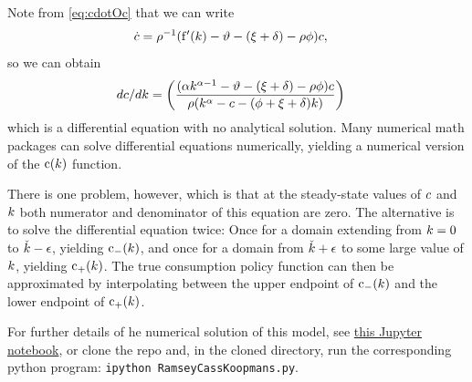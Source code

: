 \documentclass{handout}
\begin{document}
{  Note from \eqref{eq:cdotOc} that we can write
  \begin{equation}\begin{gathered}\begin{aligned}
    \dot{c} & =   \rho^{-1}(\mathrm{f}^{\prime}({k})-\vartheta -(\xi+\delta)-\rho \phi)c \label{eq:cdot},
  \end{aligned}\end{gathered}\end{equation}
  so we can obtain 
  \begin{equation}\begin{gathered}\begin{aligned}
    dc/d{k} & =  \left(\frac{(\alpha {k}^{\alpha-1}-\vartheta -(\xi+\delta)-\rho \phi)c}
                       {\rho({k}^{\alpha} - c - (\phi +\xi+\delta) {k})}\right)
  \end{aligned}\end{gathered}\end{equation}
  which is a differential equation with no analytical solution.  Many numerical math packages can solve differential equations numerically, yielding a numerical version of the $\mathrm{c}({k})$ function.

  There is one problem, however, which is that at the steady-state values of $c$ and ${k}$ both numerator and denominator of this equation are zero.  The alternative is to solve the differential equation twice: Once for a domain extending from ${k}=0$ to $\check{{k}}-\epsilon$, yielding $\mathrm{c}_{-}({k})$, and once for a domain from $\check{{k}}+\epsilon$ to some large value of ${k}$, yielding $\mathrm{c}_{+}({k})$. The true consumption policy function can then be approximated by interpolating between the upper endpoint of $\mathrm{c}_{-}({k})$ and the lower endpoint of $\mathrm{c}_{+}({k})$.

  For further details of he numerical solution of this model, see \href{https://github.com/llorracc/Jupyter/notebooks/RamseyCassKoopmans.ipynb}{this Jupyter notebook}, or clone the repo and, in the cloned directory, run the corresponding python program: \texttt{ipython RamseyCassKoopmans.py}.


}{}
\end{document}
